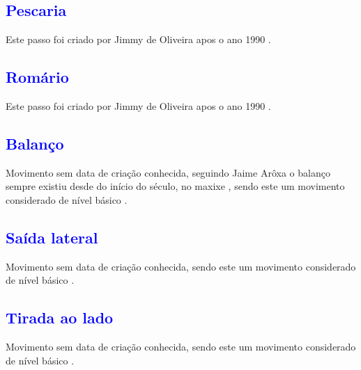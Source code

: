 \subsection{\textcolor{blue}{Pescaria}} 
Este passo foi criado por Jimmy de Oliveira apos o ano 1990 \cite{sambafunkeadoJimmyDeOliveiraPart1}.

\subsection{\textcolor{blue}{Romário}}
\label{subsec:passo:romario}
Este passo foi criado por Jimmy de Oliveira apos o ano 1990 \cite{sambafunkeadoJimmyDeOliveiraPart1}.





\subsection{\textcolor{blue}{Balanço}}
Movimento sem data de criação conhecida, 
seguindo Jaime Arôxa o balanço sempre existiu desde do início do século, 
no maxixe \cite{EntrevistaJaimeAroxa1},
sendo este um movimento considerado de nível básico \cite[pp. 144]{perna2002samba}.


\subsection{\textcolor{blue}{Saída lateral}}
Movimento sem data de criação conhecida,
sendo este um movimento considerado de nível básico \cite[pp. 144]{perna2002samba}.

\subsection{\textcolor{blue}{Tirada ao lado}}
Movimento sem data de criação conhecida,
sendo este um movimento considerado de nível básico \cite[pp. 144]{perna2002samba}.

